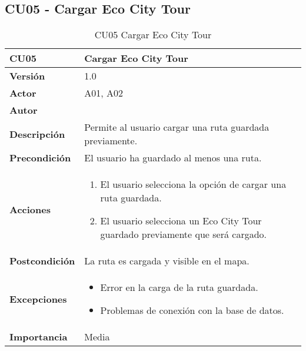 \subsection{CU05 - Cargar Eco City Tour}
\begin{table}[p]
	\centering
	\begin{tabularx}{\linewidth}{ p{} p{} }
		\toprule
		\textbf{CU05}    & \textbf{Cargar Eco City Tour} \\
		\toprule
		\textbf{Versión}              & 1.0    \\
		\textbf{Actor}                & A01, A02 \\
		\textbf{Autor}                & \autor \\
		\textbf{Descripción}          & Permite al usuario cargar una ruta guardada previamente. \\
		\textbf{Precondición}         & El usuario ha guardado al menos una ruta. \\
		\textbf{Acciones}             &
		\begin{enumerate}
			\def\labelenumi{\arabic{enumi}.}
			\tightlist
			\item El usuario selecciona la opción de cargar una ruta guardada.
			\item El usuario selecciona un Eco City Tour guardado previamente que será cargado.
		\end{enumerate}\\
		\textbf{Postcondición}        & La ruta es cargada y visible en el mapa. \\
		\textbf{Excepciones}          & 
		\begin{itemize}
			\tightlist
			\item Error en la carga de la ruta guardada.
			\item Problemas de conexión con la base de datos.
		\end{itemize}\\
		\textbf{Importancia}          & Media \\
		\bottomrule
	\end{tabularx}
	\caption{CU05 Cargar Eco City Tour}
\end{table}

